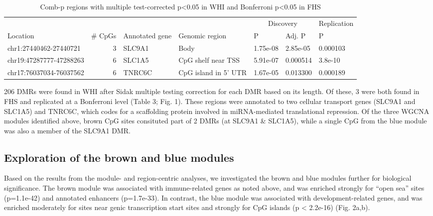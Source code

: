 \documentclass[]{article}
\theoremstyle{definition}
\theoremstyle{definition}
\theoremstyle{definition}
\theoremstyle{remark}
\begin{document}
\begin{table}

\caption{\label{tab:combp-results}Comb-p regions with multiple test-corrected p<0.05 in WHI and Bonferroni p<0.05 in FHS}
\centering
\begin{tabular}[t]{lrlllll}
\toprule
\multicolumn{1}{c}{} & \multicolumn{1}{c}{} & \multicolumn{1}{c}{} & \multicolumn{1}{c}{} & \multicolumn{2}{c}{Discovery} & \multicolumn{1}{c}{Replication} \\
\cmidrule(l{2pt}r{2pt}){5-6} \cmidrule(l{2pt}r{2pt}){7-7}
Location & \# CpGs & Annotated gene & Genomic region & P & Adj. P & P\\
\midrule
chr1:27440462-27440721 & 3 & SLC9A1 & Body & 1.75e-08 & 2.85e-05 & 0.000103\\
chr19:47287777-47288263 & 6 & SLC1A5 & CpG shelf near TSS & 5.91e-07 & 0.000514 & 3.8e-10\\
chr17:76037034-76037562 & 6 & TNRC6C & CpG island in 5' UTR & 1.67e-05 & 0.013300 & 0.000189\\
\bottomrule
\end{tabular}
\end{table}

206 DMRs were found in WHI after Sidak multiple testing correction for
each DMR based on its length. Of these, 3 were both found in FHS and
replicated at a Bonferroni level (Table 3; Fig. 1). These regions were
annotated to two cellular transport genes (SLC9A1 and SLC1A5) and
TNRC6C, which codes for a scaffolding protein involved in miRNA-mediated
translational repression. Of the three WGCNA modules identified above,
brown CpG sites consituted part of 2 DMRs (at SLC9A1 \& SLC1A5), while
a single CpG from the blue module was also a member of the SLC9A1 DMR.

\subsection{Exploration of the brown and blue
modules}\label{exploration-of-the-brown-and-blue-modules}

Based on the results from the module- and region-centric analyses, we
investigated the brown and blue modules further for biological
significance. The brown module was associated with immune-related genes
as noted above, and was enriched strongly for ``open sea'' sites
(p=1.1e-42) and annotated enhancers (p=1.7e-33). In contrast, the blue
module was associated with development-related genes, and was enriched
moderately for sites near genic transcription start sites and strongly
for CpG islands (p \textless{} 2.2e-16) (Fig. 2a,b).
\end{document}
